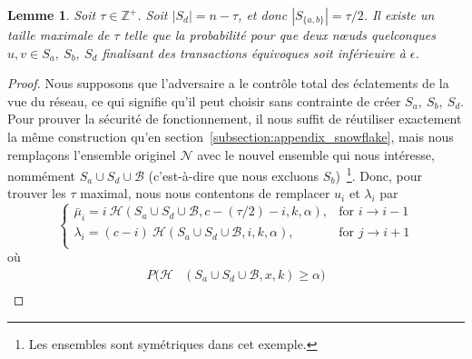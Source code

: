 \documentclass[letterpaper,twocolumn,10pt]{article}
\newtheorem{lemma}[theorem]{Lemme}
\theoremstyle{definition}
\begin{document}
\begin{appendices}
{\begin{lemma}
Soit $\tau \in \mathbb{Z}^{+}$. Soit $|S_d| = n - \tau$, et donc $|S_{\{a, b\}}| = \tau/2$. Il existe un taille maximale de $\tau$ telle que la probabilité pour que deux nœuds quelconques $u, v \in S_a,\ S_b,\ S_d$ finalisant des transactions équivoques soit inférieuire à $\epsilon$. 
\end{lemma}
\begin{proof}
Nous supposons que l'adversaire a le contrôle total des éclatements de la vue du réseau, ce qui signifie qu'il peut choisir sans contrainte de créer $S_a,\ S_b,\ S_d$. Pour prouver la sécurité de fonctionnement, il nous suffit de réutiliser exactement la même construction qu'en section~\ref{subsection:appendix_snowflake}, mais nous remplaçons l'ensemble originel $\mathcal{N}$ avec le nouvel ensemble qui nous intéresse, nommément $S_a \cup S_d \cup \mathcal{B}$ (c'est-à-dire que nous excluons $S_b$)~\footnote{Les ensembles sont symétriques dans cet exemple.}. Donc, pour trouver les $\tau$ maximal, nous nous contentons de remplacer $u_i$ et $\lambda_i$ par
\begin{equation}
    \begin{cases}
        \bar \mu_i = i\ \mathcal{H}(S_a \cup S_d \cup \mathcal{B}, c-(\tau/2)-i, k, \alpha), & \text{for } i \rightarrow i - 1 \\
        \lambda_i = (c-i)\ \mathcal{H}(S_a \cup S_d \cup \mathcal{B}, i, k, \alpha), & \text{for } j \rightarrow i + 1 \\
    \end{cases}
\end{equation}
où
\begin{equation}
\begin{split}
P(\mathcal{H}&(S_a \cup S_d \cup \mathcal{B}, x, k) \geq \alpha)\\

\end{split}
\end{equation}
\end{proof}}
\end{appendices}
\end{document}
